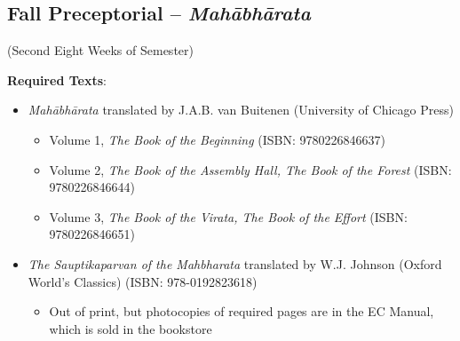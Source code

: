 \documentclass{article}
\newcounter{countSemester} %
\begin{document}


\clearpage


\begin{center}
	\section[Fall Preceptorial 2]{Fall Preceptorial -- \emph{Mahābhārata}}
	 (Second Eight Weeks of Semester)
\end{center}

\textbf{Required Texts}:
\newcommand{\fallPreceptTwoReadingList}{%
	\begin{itemize}
		\item \textit{Mahābhārata} translated by J.A.B. van Buitenen (University of Chicago Press)
		      \begin{itemize}
			      \item Volume 1, \textit{The Book of the Beginning} (ISBN: 9780226846637)
			      \item Volume 2, \textit{The Book of the Assembly Hall, The Book of the Forest} (ISBN: 9780226846644)
			      \item Volume 3, \textit{The Book of the Virata, The Book of the Effort} (ISBN: 9780226846651)
		      \end{itemize}
		\item \textit{The Sauptikaparvan of the Mahbharata} translated by W.J. Johnson (Oxford World’s Classics) (ISBN: 978-0192823618)
		      \begin{itemize}
			      \item Out of print, but photocopies of required pages are in the EC Manual, which is sold in the bookstore
		      \end{itemize}
	\end{itemize}
}
\fallPreceptTwoReadingList%
\end{document}
